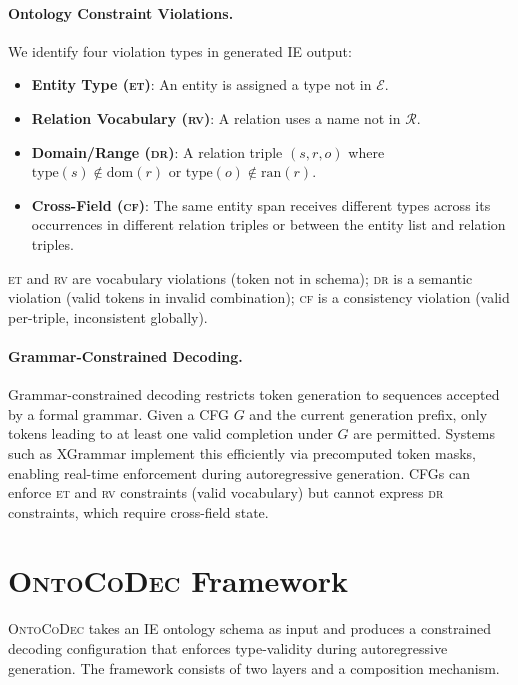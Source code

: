\documentclass[11pt,a4paper]{article}
\newcommand{\sys}{\textsc{OntoCoDec}}
\newcommand{\DR}{\textsc{dr}}
\newcommand{\RV}{\textsc{rv}}
\newcommand{\ET}{\textsc{et}}
\newcommand{\CF}{\textsc{cf}}
\begin{document}
\paragraph{Ontology Constraint Violations.}
We identify four violation types in generated IE output:
\begin{itemize}[nosep,leftmargin=*]
    \item \textbf{Entity Type (\ET{})}: An entity is assigned a type not in $\mathcal{E}$.
    \item \textbf{Relation Vocabulary (\RV{})}: A relation uses a name not in $\mathcal{R}$.
    \item \textbf{Domain/Range (\DR{})}: A relation triple $(s, r, o)$ where $\text{type}(s) \notin \text{dom}(r)$ or $\text{type}(o) \notin \text{ran}(r)$.
    \item \textbf{Cross-Field (\CF{})}: The same entity span receives different types across its occurrences in different relation triples or between the entity list and relation triples.
\end{itemize}
\ET{} and \RV{} are vocabulary violations (token not in schema); \DR{} is a semantic violation (valid tokens in invalid combination); \CF{} is a consistency violation (valid per-triple, inconsistent globally).

\paragraph{Grammar-Constrained Decoding.}
Grammar-constrained decoding restricts token generation to sequences accepted by a formal grammar. Given a CFG $G$ and the current generation prefix, only tokens leading to at least one valid completion under $G$ are permitted. Systems such as XGrammar implement this efficiently via precomputed token masks, enabling real-time enforcement during autoregressive generation. CFGs can enforce \ET{} and \RV{} constraints (valid vocabulary) but cannot express \DR{} constraints, which require cross-field state.

\section{\sys{} Framework}
\label{sec:method}

\sys{} takes an IE ontology schema as input and produces a constrained decoding configuration that enforces type-validity during autoregressive generation. The framework consists of two layers and a composition mechanism.
\end{document}
